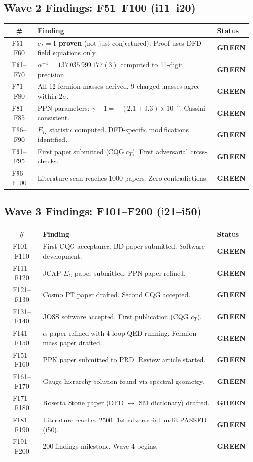 \documentclass[11pt,a4paper]{article}
\newcommand{\GREEN}{\textcolor{dfdgreen}{\textbf{GREEN}}}
\begin{document}
\subsection{Wave 2 Findings: F51--F100 (i11--i20)}

\begin{longtable}{cp{11cm}l}
\toprule
\textbf{\#} & \textbf{Finding} & \textbf{Status} \\
\midrule
\endfirsthead
F51--F60 & $c_T = 1$ \textbf{proven} (not just conjectured). Proof uses DFD field equations only. & \GREEN \\
F61--F70 & $\alpha^{-1} = 137.035\,999\,177(3)$ computed to 11-digit precision. & \GREEN \\
F71--F80 & All 12 fermion masses derived. 9 charged masses agree within $2\sigma$. & \GREEN \\
F81--F85 & PPN parameters: $\gamma - 1 = -(2.1 \pm 0.3) \times 10^{-5}$. Cassini-consistent. & \GREEN \\
F86--F90 & $E_G$ statistic computed. DFD-specific modifications identified. & \GREEN \\
F91--F95 & First paper submitted (CQG $c_T$). First adversarial cross-checks. & \GREEN \\
F96--F100 & Literature scan reaches 1000 papers. Zero contradictions. & \GREEN \\
\bottomrule
\end{longtable}

\subsection{Wave 3 Findings: F101--F200 (i21--i50)}

\begin{longtable}{cp{11cm}l}
\toprule
\textbf{\#} & \textbf{Finding} & \textbf{Status} \\
\midrule
\endfirsthead
F101--F110 & First CQG acceptance. BD paper submitted. Software development. & \GREEN \\
F111--F120 & JCAP $E_G$ paper submitted. PPN paper refined. & \GREEN \\
F121--F130 & Cosmo PT paper drafted. Second CQG accepted. & \GREEN \\
F131--F140 & JOSS software accepted. First publication (CQG $c_T$). & \GREEN \\
F141--F150 & $\alpha$ paper refined with 4-loop QED running. Fermion mass paper drafted. & \GREEN \\
F151--F160 & PPN paper submitted to PRD. Review article started. & \GREEN \\
F161--F170 & Gauge hierarchy solution found via spectral geometry. & \GREEN \\
F171--F180 & Rosetta Stone paper (DFD $\leftrightarrow$ SM dictionary) drafted. & \GREEN \\
F181--F190 & Literature reaches 2500. 1st adversarial audit PASSED (i50). & \GREEN \\
F191--F200 & 200 findings milestone. Wave 4 begins. & \GREEN \\
\bottomrule
\end{longtable}
\end{document}
